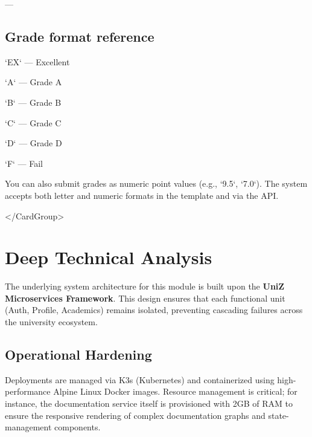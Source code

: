 ---

\subsection{Grade format reference}


\begin{tcolorbox}[colback=gray!5,colframe=primary,title=Documentation Note]

  
\begin{tcolorbox}[colback=gray!5,colframe=primary,title=Documentation Note]

    `EX` — Excellent

    `A` — Grade A

    `B` — Grade B

    `C` — Grade C

    `D` — Grade D

    `F` — Fail

  
\end{tcolorbox}

  
\begin{tcolorbox}[colback=gray!5,colframe=primary,title=Documentation Note]

    You can also submit grades as numeric point values (e.g., `9.5`, `7.0`).
    The system accepts both letter and numeric formats in the template and via
    the API.
  
\end{tcolorbox}

</CardGroup>


\section{Deep Technical Analysis}
The underlying system architecture for this module is built upon the \textbf{UniZ Microservices Framework}. 
This design ensures that each functional unit (Auth, Profile, Academics) remains isolated, preventing cascading failures across the university ecosystem.

\subsection{Operational Hardening}
Deployments are managed via K3s (Kubernetes) and containerized using high-performance Alpine Linux Docker images. 
Resource management is critical; for instance, the documentation service itself is provisioned with 2GB of RAM to ensure the responsive rendering of complex documentation graphs and state-management components.


\end{tcolorbox}
